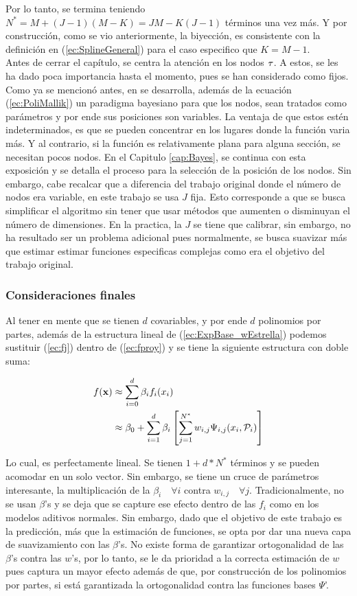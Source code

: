 \documentclass[../Main/Main.tex]{subfiles}
\begin{document}
Por lo tanto, se termina teniendo $N^* = M + (J-1)(M-K) = JM - K(J-1)$ términos una vez más. Y por construcción, como se vio anteriormente, la biyección, es consistente con la definición en (\ref{ec:SplineGeneral}) para el caso especifico que $K = M-1$. \\

Antes de cerrar el capítulo, se centra la atención en los nodos $\tau$. A estos, se les ha dado poca importancia hasta el momento, pues se han considerado como fijos. Como ya se mencionó antes, en \autocite{mallik1998automatic} se desarrolla, además de la ecuación (\ref{ec:PoliMallik}) un paradigma bayesiano para que los nodos, sean tratados como parámetros y por ende sus posiciones son variables. La ventaja de que estos estén indeterminados, es que se pueden concentrar en los lugares donde la función varia más. Y al contrario, si la función es relativamente plana para alguna sección, se necesitan pocos nodos. En el Capitulo \ref{cap:Bayes}, se continua con esta exposición y se detalla el proceso para la selección de la posición de los nodos. Sin embargo, cabe recalcar que a diferencia del trabajo original donde el número de nodos era variable, en este trabajo se usa $J$ fija. Esto corresponde a que se busca simplificar el algoritmo sin tener que usar métodos que aumenten o disminuyan el número de dimensiones. En la practica, la $J$ se tiene que calibrar, sin embargo, no ha resultado ser un problema adicional pues normalmente, se busca suavizar más que estimar estimar funciones especificas complejas como era el objetivo del trabajo original.

\subsubsection*{Consideraciones finales}

Al tener en mente que se tienen $d$ covariables, y por ende $d$ polinomios por partes, además de la estructura lineal de (\ref{ec:ExpBase_wEstrella}) podemos sustituir (\ref{ec:fj}) dentro de (\ref{ec:fproy}) y se tiene la siguiente estructura con doble suma:

\begin{align*}
	f(\mathbf{x}) &\approx \sum_{i=0}^d \beta_i f_i(x_i) \\
			&\approx \beta_0 + \sum_{i=1}^d \beta_i \left[\sum_{j=1}^{N^*} w_{i,j}\Psi_{i,j}(x_i, \mathcal{P}_i)\right]
\end{align*}

Lo cual, es perfectamente lineal. Se tienen $1 + d*N^*$ términos y se pueden acomodar en un solo vector. Sin embargo, se tiene un cruce de parámetros interesante, la multiplicación de la $\beta_i\quad \forall i$ contra $w_{i,j} \quad \forall j$. Tradicionalmente, no se usan $\beta$'s y se deja que se capture ese efecto dentro de las $f_i$ como en los modelos aditivos normales. Sin embargo, dado que el objetivo de este trabajo es la predicción, más que la estimación de funciones, se opta por dar una nueva capa de suavizamiento con las $\beta$'s. No existe forma de garantizar ortogonalidad de las $\beta$'s contra las $w$'s, por lo tanto, se le da prioridad a la correcta estimación de $w$ pues captura un mayor efecto además de que, por construcción de los polinomios por partes, si está garantizada la ortogonalidad contra las funciones bases $\Psi$'.
\end{document}
